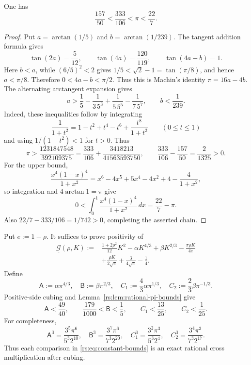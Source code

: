 \begin{lemma}
\label{rs:lem:rational-pi-bounds}
One has
\[
 \frac{157}{50}<\frac{333}{106}<\pi<\frac{22}{7}.
\]
\end{lemma}

\begin{proof}
Put $a=\arctan(1/5)$ and $b=\arctan(1/239)$.  The tangent addition
formula gives
\[
 \tan(2a)=\frac5{12},\qquad
 \tan(4a)=\frac{120}{119},\qquad
 \tan(4a-b)=1.
\]
Here $b<a$, while $(6/5)^2<2$ gives
$1/5<\sqrt2-1=\tan(\pi/8)$, and hence $a<\pi/8$.  Therefore
$0<4a-b<\pi/2$.  Thus this is Machin's identity
$\pi=16a-4b$.  The alternating arctangent expansion gives
\[
 a>\frac15-\frac1{3\,5^3}+\frac1{5\,5^5}-\frac1{7\,5^7},
 \qquad b<\frac1{239}.
\]
Indeed, these inequalities follow by integrating
\[
 \frac1{1+t^2}=1-t^2+t^4-t^6+\frac{t^8}{1+t^2}
 \qquad(0\leq t\leq1)
\]
and using $1/(1+t^2)<1$ for $t>0$.
Thus
\[
 \pi>
 \frac{1231847548}{392109375}
 =\frac{333}{106}+\frac{3418213}{41563593750},
 \qquad
 \frac{333}{106}-\frac{157}{50}=\frac2{1325}>0.
\]
For the upper bound,
\[
 \frac{x^4(1-x)^4}{1+x^2}
 =x^6-4x^5+5x^4-4x^2+4-\frac4{1+x^2},
\]
so integration and $4\arctan1=\pi$ give
\[
 0<\int_0^1\frac{x^4(1-x)^4}{1+x^2}\,dx
 =\frac{22}{7}-\pi.
\]
Also \(22/7-333/106=1/742>0\), completing the asserted chain.
\end{proof}

Put $e:=1-\rho$.  It suffices to prove positivity of
\begin{equation}
 \begin{aligned}
 \underline{\mathcal G}(\rho,K):={}&
 \frac{1+2\rho^2}{12}K^2
 -\alpha K^{4/3}+\beta K^{2/3}
 -\frac{\pi\rho K}{4e}\\
 &+\frac{\rho K}{2\sqrt e}
 +\frac3{4\sqrt e}-\frac14.
 \end{aligned}
 \label{rs:eq:G-under}
\end{equation}
Define
\begin{equation}
 \mathsf A:=\alpha\pi^{4/3},
 \quad \mathsf B:=\beta\pi^{2/3},
 \quad C_1:=\frac43\alpha\pi^{1/3},
 \quad C_2:=\frac23\beta\pi^{-1/3}.
 \label{rs:eq:scaled-constants}
\end{equation}
Positive-side cubing and Lemma~\ref{rs:lem:rational-pi-bounds} give
\begin{equation}
 \mathsf A<\frac{49}{40},
 \qquad
 \frac{179}{1000}<\mathsf B<\frac15,
 \qquad
 C_1<\frac{13}{25},
 \qquad
 C_2<\frac1{25}.
 \label{rs:eq:constant-bounds}
\end{equation}
For completeness,
\begin{equation}
 \mathsf A^3=\frac{3^5\pi^6}{5^3 2^{10}},
 \quad
 \mathsf B^3=\frac{3^7\pi^6}{7^3 2^{20}},
 \quad
 C_1^3=\frac{3^2\pi^3}{5^3 2^4},
 \quad
 C_2^3=\frac{3^4\pi^3}{7^3 2^{17}}.
 \label{rs:eq:constant-cubes}
\end{equation}
Thus each comparison in \eqref{rs:eq:constant-bounds} is an exact rational
cross multiplication after cubing.

